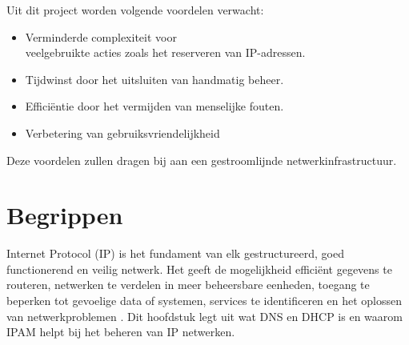 \documentclass{hogent-article}
\begin{document}
Uit dit project worden volgende voordelen verwacht:
\begin{itemize}
    \item Verminderde complexiteit voor \\veelgebruikte acties zoals het reserveren van IP-adressen.
    \item Tijdwinst door het uitsluiten van handmatig beheer.
    \item Efficiëntie door het vermijden van menselijke fouten.
    \item Verbetering van gebruiksvriendelijkheid
\end{itemize}
Deze voordelen zullen dragen bij aan een gestroomlijnde netwerkinfrastructuur.



\section{Begrippen}
\label{sec:begrippen}
Internet Protocol (IP) is het fundament van elk gestructureerd, goed functionerend en veilig netwerk. Het geeft de mogelijkheid efficiënt gegevens te routeren, netwerken te verdelen in meer beheersbare eenheden, toegang te beperken tot gevoelige data of systemen, services te identificeren en het oplossen van netwerkproblemen \autocite{Postel1981}. Dit hoofdstuk legt uit wat DNS en DHCP is en waarom IPAM helpt bij het beheren van IP netwerken. 
\end{document}
